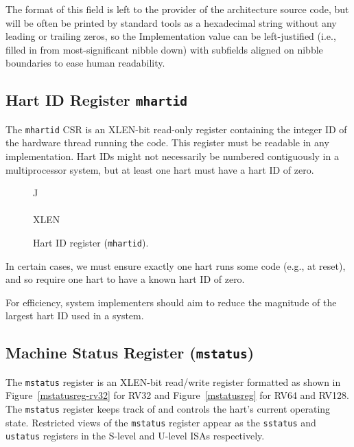 \begin{commentary}
The format of this field is left to the provider of the architecture
source code, but will be often be printed by standard tools as a
hexadecimal string without any leading or trailing zeros, so the
Implementation value can be left-justified (i.e., filled in from
most-significant nibble down) with subfields aligned on nibble
boundaries to ease human readability.
\end{commentary}

\subsection{Hart ID Register {\tt mhartid}}

The {\tt mhartid} CSR is an XLEN-bit read-only register
containing the integer ID of the hardware thread running the code.
This register must be readable in any implementation.  Hart IDs might
not necessarily be numbered contiguously in a multiprocessor system,
but at least one hart must have a hart ID of zero.

\begin{figure*}[h!]
{\footnotesize
\begin{center}
\begin{tabular}{J}
 \\
\hline
{}\\
\hline
XLEN \\
\end{tabular}
\end{center}
}
\vspace{-0.1in}
\caption{Hart ID register ({\tt mhartid}).}
\label{mhartidreg}
\end{figure*}


\begin{commentary}
In certain cases, we must ensure exactly one hart runs some code
(e.g., at reset), and so require one hart to have a known hart ID of
zero.

For efficiency, system implementers should aim to reduce the magnitude
of the largest hart ID used in a system.
\end{commentary}

\subsection{Machine Status Register ({\tt mstatus})}

The {\tt mstatus} register is an XLEN-bit read/write register
formatted as shown in Figure~\ref{mstatusreg-rv32} for RV32 and
Figure~\ref{mstatusreg} for RV64 and RV128.  The {\tt mstatus}
register keeps track of and controls the hart's current operating
state.  Restricted views of the {\tt mstatus} register appear as the
{\tt sstatus} and {\tt ustatus} registers in the S-level and U-level
ISAs respectively.

